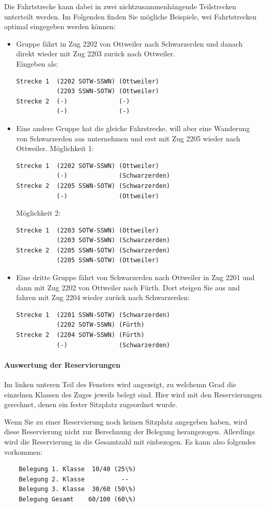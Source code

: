 Die Fahrtstrecke kann dabei in zwei nichtzusammenhängende Teilstrecken unterteilt werden.
Im Folgenden finden Sie mögliche Beispiele, wei Fahrtstrecken optimal eingegeben werden können:
\begin{itemize}
	\item Gruppe fährt in Zug 2202 von Ottweiler nach Schwarzerden und danach direkt wieder mit Zug 2203 zurück nach Ottweiler.\\
	Eingeben als:
	\begin{verbatim}Strecke 1  (2202 SOTW-SSWN) (Ottweiler)
           (2203 SSWN-SOTW) (Ottweiler)
Strecke 2  (-)              (-)
           (-)              (-)
	\end{verbatim}
	\item
	Eine andere Gruppe hat die gleiche Fahrstrecke, will aber eine Wanderung von Schwarzerden aus unternehmen und erst mit Zug 2205 wieder nach Ottweiler.
	Möglichkeit 1:
	\begin{verbatim}Strecke 1  (2202 SOTW-SSWN) (Ottweiler)
           (-)              (Schwarzerden)
Strecke 2  (2205 SSWN-SOTW) (Schwarzerden)
           (-)              (Ottweiler)
	\end{verbatim}
	Möglichkeit 2:
	\begin{verbatim}Strecke 1  (2203 SOTW-SSWN) (Ottweiler)
           (2203 SOTW-SSWN) (Schwarzerden)
Strecke 2  (2205 SSWN-SOTW) (Schwarzerden)
           (2205 SSWN-SOTW) (Ottweiler)
	\end{verbatim}
	\item
	Eine dritte Gruppe fährt von Schwarzerden nach Ottweiler in Zug 2201 und dann mit Zug 2202 von Ottweiler nach Fürth.
	Dort steigen Sie aus und fahren mit Zug 2204 wieder zurück nach Schwarzerden:
	\begin{verbatim}
Strecke 1  (2201 SSWN-SOTW) (Schwarzerden)
           (2202 SOTW-SSWN) (Fürth)
Strecke 2  (2204 SOTW-SSWN) (Fürth)
           (-)              (Schwarzerden)
	\end{verbatim}
\end{itemize}


\paragraph{Auswertung der Reservierungen}
Im linken unteren Teil des Fensters wird angezeigt, zu welchemn Grad die einzelnen Klassen des Zuges jeweils belegt sind.
Hier wird mit den Reservierungen gerechnet, denen ein fester Sitzplatz zugeordnet wurde.

Wenn Sie zu einer Reservierung noch keinen Sitzplatz angegeben haben, wird diese Reservierung nicht zur Berechnung der Belegung herangezogen.
Allerdings wird die Reservierung in die Gesamtzahl mit einbezogen.
Es kann also folgendes vorkommen:
\begin{verbatim}
	Belegung 1. Klasse  10/40 (25\%)
	Belegung 2. Klasse          --
	Belegung 3. Klasse  30/60 (50\%)
	Belegung Gesamt    60/100 (60\%)
\end{verbatim}


